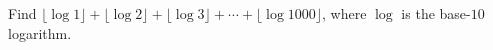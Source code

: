 Find \(\lfloor \log 1\rfloor+\lfloor\log 2\rfloor+\lfloor\log 3\rfloor+\cdots+\lfloor\log 1000\rfloor\), where \(\log\) is the base-\(10\) logarithm.
